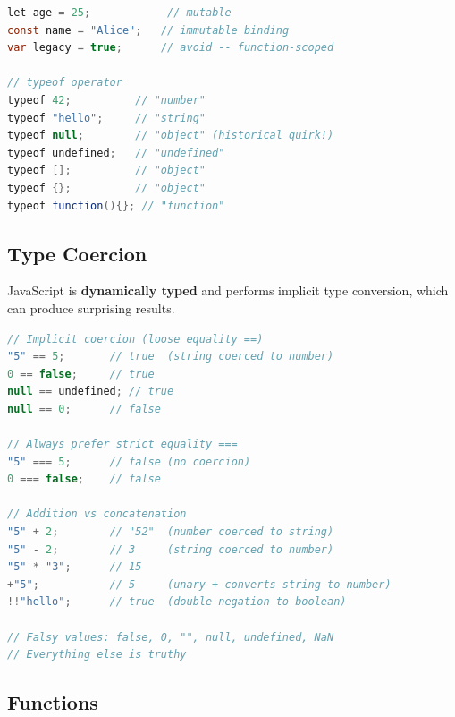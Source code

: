 \documentclass[hidelinks]{article}
\begin{document}
\begin{lstlisting}[language=Java, caption={Variable declarations}]
let age = 25;            // mutable
const name = "Alice";   // immutable binding
var legacy = true;      // avoid -- function-scoped

// typeof operator
typeof 42;          // "number"
typeof "hello";     // "string"
typeof null;        // "object" (historical quirk!)
typeof undefined;   // "undefined"
typeof [];          // "object"
typeof {};          // "object"
typeof function(){}; // "function"
\end{lstlisting}

\subsection{Type Coercion}
JavaScript is \textbf{dynamically typed} and performs implicit type conversion, which can produce surprising results.

\begin{lstlisting}[language=Java, caption={Type coercion examples}]
// Implicit coercion (loose equality ==)
"5" == 5;       // true  (string coerced to number)
0 == false;     // true
null == undefined; // true
null == 0;      // false

// Always prefer strict equality ===
"5" === 5;      // false (no coercion)
0 === false;    // false

// Addition vs concatenation
"5" + 2;        // "52"  (number coerced to string)
"5" - 2;        // 3     (string coerced to number)
"5" * "3";      // 15
+"5";           // 5     (unary + converts string to number)
!!"hello";      // true  (double negation to boolean)

// Falsy values: false, 0, "", null, undefined, NaN
// Everything else is truthy
\end{lstlisting}

\subsection{Functions}
\end{document}
